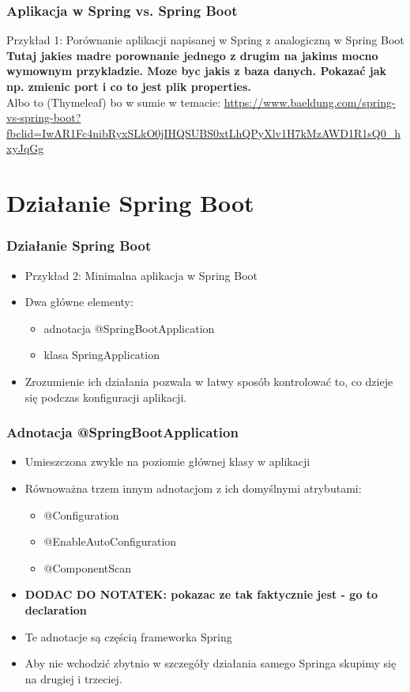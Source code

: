 \documentclass{beamer}
\begin{document}
\begin{frame}
\frametitle{Aplikacja w Spring vs. Spring Boot}
Przykład 1: Porównanie aplikacji napisanej w Spring z analogiczną w Spring Boot \\
\textbf{Tutaj jakies madre porownanie jednego z drugim na jakims mocno wymownym przykladzie. Moze byc jakis z baza danych. Pokazać jak np. zmienic port i co to jest plik properties.}\\
Albo to (Thymeleaf) bo w sumie w temacie: \url{https://www.baeldung.com/spring-vs-spring-boot?fbclid=IwAR1Fc4nibRyxSLkO0jIHQSUBS0xtLhQPyXlv1H7kMzAWD1R1sQ0_hxyJqGg}
\end{frame}

\section{Działanie Spring Boot}


\begin{frame}
\frametitle{Działanie Spring Boot}
\begin{itemize}
\item Przykład 2: Minimalna aplikacja w Spring Boot
\item Dwa główne elementy:
\begin{itemize}
    \item adnotacja @SpringBootApplication
    \item klasa SpringApplication
\end{itemize}
\item Zrozumienie ich działania pozwala w łatwy sposób kontrolować to, co dzieje się podczas konfiguracji aplikacji.
\end{itemize}
\end{frame}

\begin{frame}
\frametitle{Adnotacja @SpringBootApplication}
\begin{itemize}
\item Umieszczona zwykle na poziomie głównej klasy w aplikacji 
\item Równoważna trzem innym adnotacjom z ich domyślnymi atrybutami:
\begin{itemize}
    \item @Configuration
    \item @EnableAutoConfiguration
    \item @ComponentScan
\end{itemize}
\item \textbf{DODAC DO NOTATEK: pokazac ze tak faktycznie jest - go to declaration}
\item Te adnotacje są częścią frameworka Spring
\item Aby nie wchodzić zbytnio w szczegóły działania samego Springa skupimy się na drugiej i trzeciej.
\end{itemize}
\end{frame}
\end{document}
